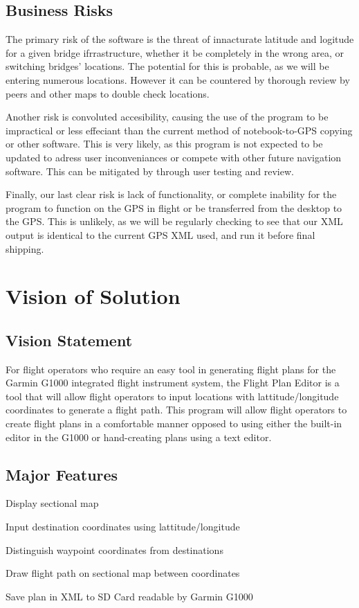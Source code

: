 \documentclass[12pt, letterpaper]{article}
\begin{document}
\subsection{Business Risks}
The primary risk of the software is the threat of innacturate latitude and logitude for a given bridge ifrrastructure, whether it be completely in the wrong area, or switching bridges' locations. The potential for this is probable, as we will be entering numerous locations. However it can be countered by thorough review by peers and other maps to double check locations.

Another risk is convoluted accesibility, causing the use of the program to be impractical or less effeciant than the current method of notebook-to-GPS copying or other software. This is very likely, as this program is not expected to be updated to adress user inconveniances or compete with other future navigation software. This can be mitigated by through user testing and review. 

Finally, our last clear risk is lack of functionality, or complete inability for the program to function on the GPS in flight or be transferred from the desktop to the GPS. This is unlikely, as we will be regularly checking to see that our XML output is identical to the current GPS XML used, and run it before final shipping. 

\section{Vision of Solution}
  \subsection{Vision Statement}
    For flight operators who require an easy tool in generating flight plans for
    the Garmin G1000 integrated flight instrument system, the Flight Plan Editor
    is a tool that will allow flight operators to input locations with
    lattitude/longitude coordinates to generate a flight path.
    This program will allow flight operators to create flight plans in a
    comfortable manner opposed to using either the built-in editor in the G1000
    or hand-creating plans using a text editor.

  \subsection{Major Features}
    \begin{description}
      \setlength{\itemsep}{1pt}
      \setlength{\parskip}{0pt}
      \setlength{\parsep}{0pt}
      \item[FE-01] Display sectional map
      \item[FE-02] Input destination coordinates using lattitude/longitude
      \item[FE-03] Distinguish waypoint coordinates from destinations
      \item[FE-04] Draw flight path on sectional map between coordinates
      \item[FE-05] Save plan in XML to SD Card readable by Garmin G1000
    \end{description}
\end{document}
